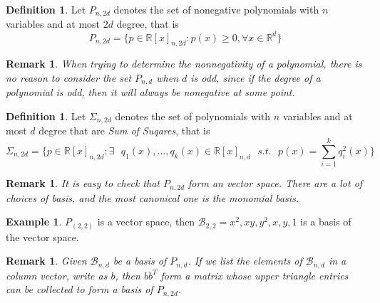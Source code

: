 \documentclass[12pt]{amsart}
\numberwithin{equation}{section}
\newtheorem{remark}[thm]{Remark}
\theoremstyle{definition}
\newtheorem{definition}[thm]{Definition}
\newtheorem{example}[thm]{Example}
\numberwithin{thm}{section}
\begin{document}
\begin{definition}
     \label{def:NGP}
     Let $P_{n, 2d}$ denotes the set of nonegative polynomials with 
     $n$ variables and at most $2d$ degree, that is 
     \begin{equation}
          P_{n, 2d} = \{ p \in \mathbb{R}[x]_{n, 2d}: p(x) \geq 0, \forall x \in \mathbb{R}^d \}
     \end{equation}
\end{definition}

\begin{remark}
     When trying to determine the nonnegativity of a polynomial, there is no reason to consider the set $P_{n, d}$ when $d$ is odd, since if the 
     degree of a polynomial is odd, then it will always be nonegative at some point.
\end{remark}

\begin{definition}
\label{def:SOS}
     Let $\Sigma_{n,2d}$ denotes the set of polynomials with $n$ variables and at most
     $d$ degree that are \emph{Sum of Suqares}, that is
     \begin{equation}
          \Sigma_{n, 2d} = \{ p \in \mathbb{R}[x]_{n, 2d}: \exists \text{ } q_1(x), ..., q_k(x) \in \mathbb{R}[x]_{n,d} \text{ } s.t. \text{ }  p(x) = \sum_{i=1}^k q_i^2(x)\}
     \end{equation}     
\end{definition}

\begin{remark}
     It is easy to check that $P_{n, 2d}$ form an vector space. There are a lot of choices of basis, and the most canonical one is the monomial basis.
\end{remark}

\begin{example}
     $P_(2, 2)$ is a vector space, then $\mathcal{B}_{2, 2} = {x^2, xy, y^2, x, y, 1}$ is a basis of the vector space.
\end{example}

\begin{remark}
     Given $\mathcal{B}_{n, d}$ be a basis of $P_{n, d}$. If we list the elements of $\mathcal{B}_{n, d}$ in a column vector, write as $b$, then $b b^T$ form a matrix whose upper triangle entries can be collected to form a basis of $P_{n, 2d}$.
\end{remark}
\end{document}
